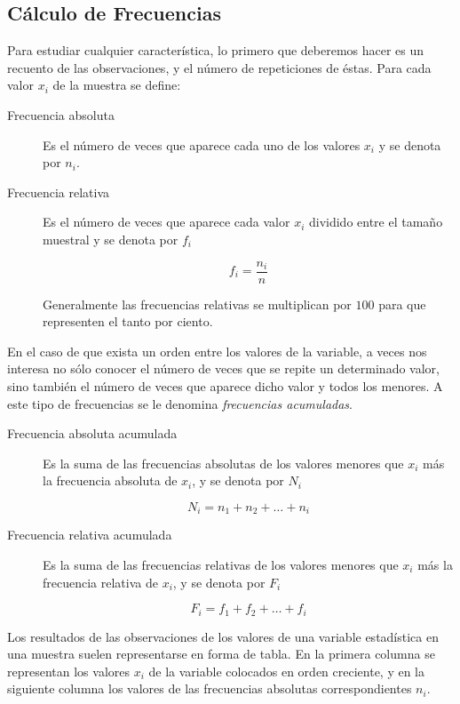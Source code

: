 \subsection{Cálculo de Frecuencias}
Para estudiar cualquier característica, lo primero que deberemos hacer es un recuento de las observaciones, y el número
de repeticiones de éstas. Para cada valor $x_i$ de la muestra se define:
\begin{description}
\item[Frecuencia absoluta] Es el número de veces que aparece cada uno de los valores $x_i$ y se denota por $n_i$.

\item [Frecuencia relativa] Es el número de veces que aparece cada valor $x_i$ dividido entre el tamaño muestral y se
denota por $f_i$

\[f_i=\frac{n_i}{n}\]

Generalmente las frecuencias relativas se multiplican por $100$ para que representen el tanto por ciento.
\end{description}

En el caso de que exista un orden entre los valores de la variable, a veces nos interesa no sólo conocer el número de
veces que se repite un determinado valor, sino también el número de veces que aparece dicho valor y todos los menores. A
este tipo de frecuencias se le denomina \emph{frecuencias acumuladas}.

\begin{description}
\item [Frecuencia absoluta acumulada] Es la suma de las frecuencias absolutas de los valores menores que $x_i$ más la frecuencia
absoluta de $x_i$, y se denota por $N_i$

\[N_i=n_1+n_2+\ldots+n_i\]

\item [Frecuencia relativa acumulada] Es la suma de las frecuencias relativas de los valores menores que $x_i$ más la frecuencia
relativa de $x_i$, y se denota por $F_i$

\[F_i=f_1+f_2+\ldots+f_i\]
\end{description}

Los resultados de las observaciones de los valores de una variable estadística en una muestra suelen representarse en
forma de tabla.
En la primera columna se representan los valores $x_i$ de la variable colocados en orden creciente, y en la siguiente
columna los valores de las frecuencias absolutas correspondientes $n_i$.

